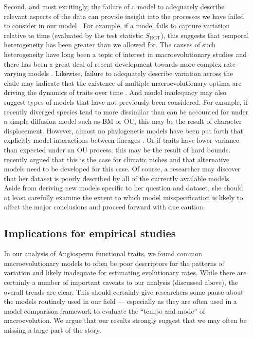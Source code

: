 \documentclass[a4paper,11pt]{article}
\begin{document}
{Second, and most excitingly, the failure of a model to adequately describe relevant aspects of the data can provide insight into the processes we have failed to consider in our model \citep{Gelman2012}. For example, if a model fails to capture variation relative to time (evaluated by the test statistic $S_{\text{HGT}}$), this suggests that temporal heterogeneity has been greater than we allowed for. The causes of such heterogeneity have long been a topic of interest in macroevolutionary studies \citep[e.g.,][]{Simpson1944, Foote1997} and there has been a great deal of recent development towards more complex rate--varying models \citep[e.g.,][]{Omeara2006, Thomas2006, Eastman2011, Weir2012, RaboskyBAMM}. Likewise, failure to adequately describe variation across the clade may indicate that the existence of multiple macroevolutionary optima \citep[sensu][]{Hansen2012book} are driving the dynamics of traits over time \citep[see][for models that have been used to capture these dynamics]{Hansen1997, ButlerKing2004, Beaulieu2012, IngramMahler2013, UyedaBayou}. And model inadequacy may also suggest types of models that have not previously been considered. For example, if recently diverged species tend to more dissimilar than can be accounted for under a simple diffusion model such as BM or OU, this may be the result of character displacement. However, almost no phylogenetic models have been put forth that explicitly model interactions between lineages \citep[but see][]{NuismerHarmon}. Or if traits have lower variance than expected under an OU process, this may be the result of hard bounds. \citet{Davies2014} recently argued that this is the case for climatic niches and that alternative models need to be developed for this case. Of course, a researcher may discover that her dataset is poorly described by all of the currently available models. Aside from deriving new models specific to her question and dataset, she should at least carefully examine the extent to which model misspecification is likely to affect the major conclusions and proceed forward with due caution.
 
\subsection{Implications for empirical studies}

In our analysis of Angiosperm functional traits, we found common macroevolutionary models to often be poor descriptors for the patterns of variation and likely inadequate for estimating evolutionary rates. While there are certainly a number of important caveats to our analysis (discussed above), the overall trends are clear. This should certainly give researchers some pause about the models routinely used in our field --- especially as they are often used in a model comparison framework to evaluate the ``tempo and mode'' of macroevolution. We argue that our results strongly suggest that we may often be missing a large part of the story.

}
\end{document}
